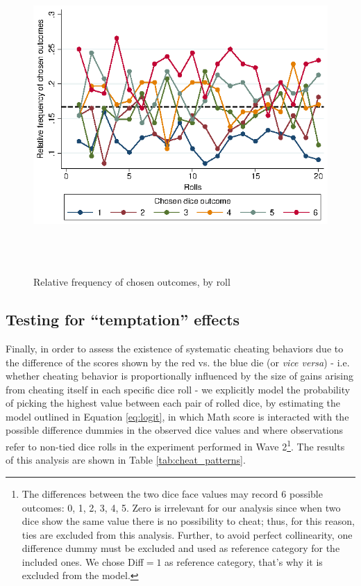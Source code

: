 \documentclass[authoryear, preprint, review, 12pt]{elsarticle}
\begin{document}
\begin{figure}[h!]
\centering
\includegraphics[width=12cm,height=12cm, keepaspectratio]{figures/rolls_frequency.eps}
\caption{Relative frequency of chosen outcomes, by roll}\label{fig:rollfreq}
\end{figure}

\subsection{Testing for \enquote{temptation} effects}
\label{sub:temptation}
Finally, in order to assess the existence of systematic cheating behaviors due to the difference of the scores shown by the red vs. the blue die (or \textit{vice versa}) - i.e. whether cheating behavior is proportionally influenced by the size of gains arising from cheating itself in each specific dice roll - we explicitly model the probability of picking the highest value between each pair of rolled dice, by estimating the model outlined in Equation \ref{eq:logit}, in which Math score is interacted with the possible difference dummies in the observed dice values and where observations refer to non-tied dice rolls in the experiment performed in Wave 2\footnote{The differences between the two dice face values may record 6 possible outcomes: 0, 1, 2, 3, 4, 5. Zero is irrelevant for our analysis since when two dice show the same value there is no possibility to cheat; thus, for this reason, ties are excluded from this analysis. Further, to avoid perfect collinearity, one difference dummy must be excluded and used as reference category for the included ones. We chose Diff$=1$ as reference category, that's why it is excluded from the model.}. The results of this analysis are shown in Table \ref{tab:cheat_patterns}.
\end{document}
